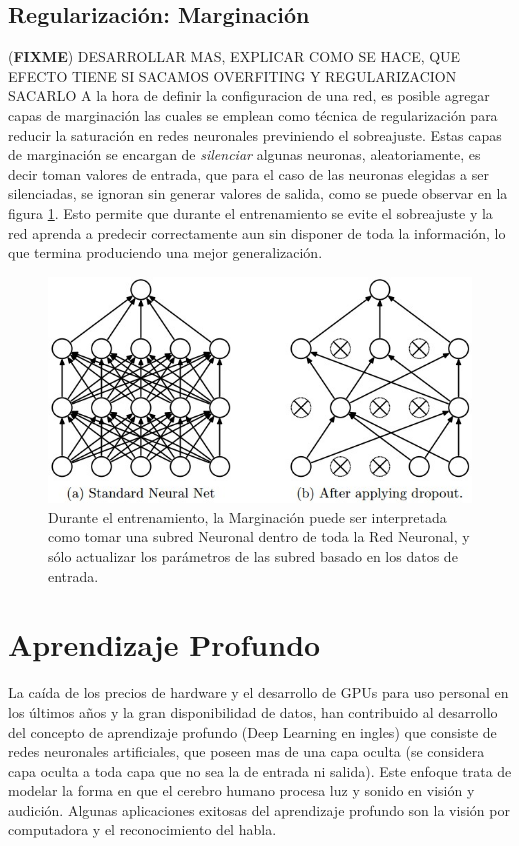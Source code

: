 \documentclass[a4paper,11pt,spanish]{book}
\newcommand*{\FIXME}[1]{{(\textbf{FIXME}) {#1}}}
\begin{document}
\iffalse
      \subsection {Regularización: Marginación}
	\FIXME{DESARROLLAR MAS, EXPLICAR COMO SE HACE, QUE EFECTO TIENE SI SACAMOS OVERFITING Y REGULARIZACION SACARLO}
	A la hora de definir la configuracion de una red, es posible agregar capas de marginación las cuales se emplean como
	técnica de regularización para reducir la saturación en redes neuronales previniendo el sobreajuste. Estas capas de marginación se encargan de
	\emph{silenciar} algunas neuronas, aleatoriamente, es decir toman valores de entrada, que para el caso de las neuronas elegidas a ser silenciadas, se ignoran
	sin generar valores de salida, como se puede observar en la figura \ref{fig:dropout}. Esto permite que durante el entrenamiento se evite el sobreajuste y la red aprenda
	a predecir correctamente aun sin disponer de toda la información, lo que termina produciendo una mejor generalización.
	\begin{figure}[ht]
	  \begin{center}
	   \includegraphics[width=0.6\linewidth]{./img/dropout.jpeg}
	  \end{center}
	  \caption{Durante el entrenamiento, la Marginación puede ser interpretada como tomar una subred Neuronal dentro de toda la Red Neuronal, y sólo actualizar los parámetros
	  de las subred basado en los datos de entrada. \cite{Srivastava:Dropout} }
	  \label{fig:dropout}
	\end{figure}

  \section {Aprendizaje Profundo}
    La caída de los precios de hardware y el desarrollo de GPUs para uso personal en los últimos años y la gran disponibilidad de datos, han contribuido al desarrollo del
    concepto de aprendizaje profundo (Deep Learning en ingles)
    que consiste de redes neuronales artificiales, que poseen mas de una capa oculta (se considera capa oculta a toda capa que no sea la de entrada ni salida). Este enfoque trata de
    modelar la forma en que el cerebro humano procesa luz y sonido en visión y audición.
    Algunas aplicaciones exitosas del aprendizaje profundo son la visión por computadora y el reconocimiento del habla.
\end{document}
